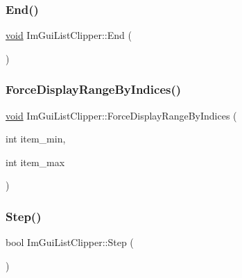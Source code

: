 \mbox{\label{structImGuiListClipper_a3e6aec0db317985319a78513fc2c8068}} 
\subsubsection{\texorpdfstring{End()}{End()}}
{\footnotesize\ttfamily \hyperlink{imgui__impl__opengl3__loader_8h_ac668e7cffd9e2e9cfee428b9b2f34fa7}{void} Im\+Gui\+List\+Clipper\+::\+End (\begin{DoxyParamCaption}{ }\end{DoxyParamCaption})}

\mbox{\label{structImGuiListClipper_a65dabd7fe41071f079c83a3615f48be9}} 
\subsubsection{\texorpdfstring{Force\+Display\+Range\+By\+Indices()}{ForceDisplayRangeByIndices()}}
{\footnotesize\ttfamily \hyperlink{imgui__impl__opengl3__loader_8h_ac668e7cffd9e2e9cfee428b9b2f34fa7}{void} Im\+Gui\+List\+Clipper\+::\+Force\+Display\+Range\+By\+Indices (\begin{DoxyParamCaption}\item[{int}]{item\+\_\+min,  }\item[{int}]{item\+\_\+max }\end{DoxyParamCaption})}

\mbox{\label{structImGuiListClipper_ac3e115812c3c4e5a39578a7aa955379a}} 
\subsubsection{\texorpdfstring{Step()}{Step()}}
{\footnotesize\ttfamily bool Im\+Gui\+List\+Clipper\+::\+Step (\begin{DoxyParamCaption}{ }\end{DoxyParamCaption})}



